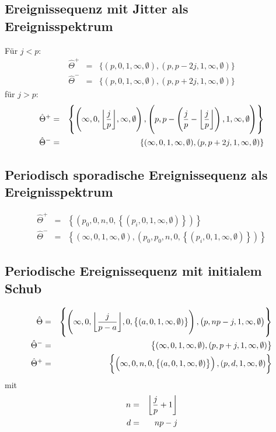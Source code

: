 \subsection{Ereignissequenz mit Jitter als Ereignisspektrum}
Für $j<p$:
\begin{eqnarray}
    \hat{\Theta}^+ &=& \{(p,0,1,\infty, \emptyset), (p, p-2j, 1, \infty, \emptyset)\} \\
    \hat{\Theta}^- &=& \{(p,0,1,\infty, \emptyset), (p, p+2j, 1, \infty, \emptyset)\}
\end{eqnarray}
für $j>p$:
\begin{eqnarray}
    \hat{\Theta}^+ &=& \left\{\left(\infty, 0, \floor*{\frac{j}{p}}, \infty, \emptyset\right), \left(p, p-\left(\frac{j}{p} - \floor*{\frac{j}{p}}\right), 1, \infty, \emptyset\right)\right\} \\
    \hat{\Theta}^- &=& \{(\infty,0,1,\infty, \emptyset), (p, p+2j, 1, \infty, \emptyset)\} 
\end{eqnarray}

\subsection{Periodisch sporadische Ereignissequenz als Ereignisspektrum}
\begin{eqnarray}
    \hat{\Theta}^+ &=& \left\{ \left( p_0, 0, n, 0, \left\{(p_i, 0, 1, \infty, \emptyset)\right\}\right)\right\} \\ 
    \hat{\Theta}^- &=& \left\{ \left( \infty, 0, 1, \infty, \emptyset\right),
        \left(p_0, p_0, n, 0, \left\{ (p_i, 0, 1, \infty, \emptyset) \right\} \right)
        \right\}
\end{eqnarray}

\subsection{Periodische Ereignissequenz mit initialem Schub}
\begin{eqnarray}
    \hat{\Theta} &=& \left\{\left(\infty, 0, \floor*{\frac{j}{p-a}}, 0,
        \left\{(a, 0, 1, \infty, \emptyset)\right\}\right), \left(p, np-j, 1, \infty, \emptyset\right)\right\} \\
    \hat{\Theta}^- &=& \left\{(\infty, 0, 1, \infty, \emptyset), (p, p+j, 1, \infty, \emptyset)\right\} \\
    \hat{\Theta}^+ &=& \left\{\left(\infty, 0, n, 0, \left\{(a,0,1,\infty,\emptyset)\right\}\right), (p, d, 1, \infty, \emptyset)\right\}
\end{eqnarray}
mit
\begin{eqnarray}
    n &=& \floor*{\frac{j}{p}+1} \\
    d &=& n p -j
\end{eqnarray}
